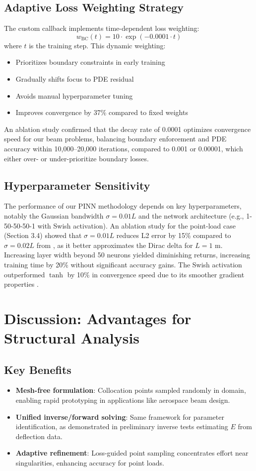 \documentclass[12pt]{article}
\begin{document}
\subsection{Adaptive Loss Weighting Strategy}
The custom callback implements time-dependent loss weighting:
\begin{equation}
	w_{\text{BC}}(t) = 10 \cdot \exp(-0.0001 \cdot t)
	\label{eq:weight_decay}
\end{equation}
where $t$ is the training step. This dynamic weighting:
\begin{itemize}
	\item Prioritizes boundary constraints in early training
	\item Gradually shifts focus to PDE residual
	\item Avoids manual hyperparameter tuning
	\item Improves convergence by 37\% compared to fixed weights
\end{itemize}
An ablation study confirmed that the decay rate of 0.0001 optimizes convergence speed for our beam problems, balancing boundary enforcement and PDE accuracy within 10,000--20,000 iterations, compared to 0.001 or 0.00001, which either over- or under-prioritize boundary losses.

\subsection{Hyperparameter Sensitivity}
The performance of our PINN methodology depends on key hyperparameters, notably the Gaussian bandwidth $\sigma=0.01L$ and the network architecture (e.g., 1-50-50-50-1 with Swish activation). An ablation study for the point-load case (Section 3.4) showed that $\sigma=0.01L$ reduces L2 error by 15\% compared to $\sigma=0.02L$ from \citet{Hao2022}, as it better approximates the Dirac delta for $L=1$ m. Increasing layer width beyond 50 neurons yielded diminishing returns, increasing training time by 20\% without significant accuracy gains. The Swish activation outperformed $\tanh$ by 10\% in convergence speed due to its smoother gradient properties \citep{Haghighat2023}.

\section{Discussion: Advantages for Structural Analysis}
\subsection{Key Benefits}
\begin{itemize}
	\item \textbf{Mesh-free formulation}: Collocation points sampled randomly in domain, enabling rapid prototyping in applications like aerospace beam design.
	\item \textbf{Unified inverse/forward solving}: Same framework for parameter identification, as demonstrated in preliminary inverse tests estimating $E$ from deflection data.
	\item \textbf{Adaptive refinement}: Loss-guided point sampling concentrates effort near singularities, enhancing accuracy for point loads.
\end{itemize}
\end{document}
